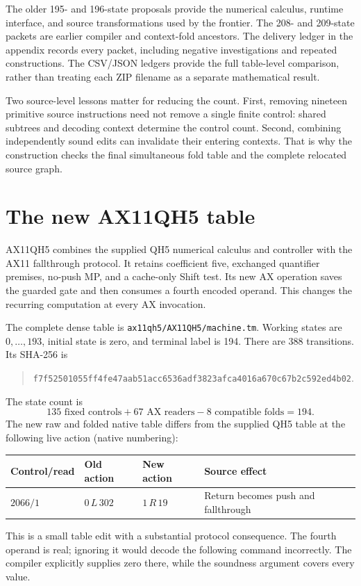 \documentclass[11pt]{article}
\newcommand{\file}[1]{\nolinkurl{#1}}
\begin{document}
The older 195- and 196-state proposals provide the numerical calculus,
runtime interface, and source transformations used by the frontier. The
208- and 209-state packets are earlier compiler and context-fold ancestors.
The delivery ledger in the appendix records every packet, including
negative investigations and repeated constructions. The CSV/JSON ledgers
provide the full table-level comparison, rather than treating each ZIP
filename as a separate mathematical result.

Two source-level lessons matter for reducing the count. First, removing
nineteen primitive source instructions need not remove a single finite
control: shared subtrees and decoding context determine the control count.
Second, combining independently sound edits can invalidate their entering
contexts. That is why the construction checks the final simultaneous fold
table and the complete relocated source graph.

\section{The new AX11QH5 table}

AX11QH5 combines the supplied QH5 numerical calculus and controller with
the AX11 fallthrough protocol. It retains coefficient five, exchanged
quantifier premises, no-push MP, and a cache-only Shift test. Its new AX
operation saves the guarded gate and then consumes a fourth encoded
operand. This changes the recurring computation at every AX invocation.

The complete dense table is
\file{ax11qh5/AX11QH5/machine.tm}. Working states are $0,\ldots,193$,
initial state is zero, and terminal label is 194. There are 388 transitions.
Its SHA-256 is
\begin{quote}\small\nolinkurl{f7f52501055ff4fe47aab51acc6536adf3823afca4016a670c67b2c592ed4b02}.\end{quote}
The state count is
\[
             135\text{ fixed controls}+67\text{ AX readers}
                          -8\text{ compatible folds}=194.
\]
The new raw and folded native table differs from the supplied QH5 table
at the following live action (native numbering):
\begin{center}
\begin{tabular}{@{}llll@{}}\toprule
Control/read & Old action & New action & Source effect\\\midrule
$2066/1$ & $0\,L\,302$ & $1\,R\,19$ & Return becomes push and fallthrough\\\bottomrule
\end{tabular}
\end{center}
This is a small table edit with a substantial protocol consequence. The
fourth operand is real; ignoring it would decode the following command
incorrectly. The compiler explicitly supplies zero there, while the
soundness argument covers every value.
\end{document}
